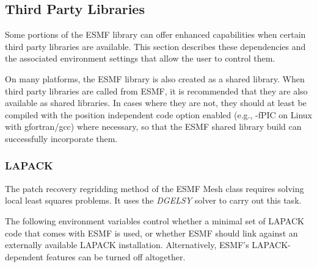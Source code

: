 \subsection{Third Party Libraries}
\label{sec:ThirdParty}

Some portions of the ESMF library can offer enhanced capabilities when
certain third party libraries are available. This section describes
these dependencies and the associated environment settings
that allow the user to control them.

On many platforms, the ESMF library is also created as a shared library.
When third party libraries are called from ESMF, it is recommended that they are
also available as shared libraries.  In cases where they are not, they should at
least be compiled with the position independent code option enabled (e.g., -fPIC on
Linux with gfortran/gcc) where necessary, so that the ESMF shared library
build can successfully incorporate them.

\subsubsection{LAPACK}
\label{sec:lapack}
The patch recovery regridding method of the ESMF Mesh class requires solving
local least squares problems. It uses the
 {\it DGELSY} solver 
to carry out this task.

The following environment variables control whether a minimal set of
LAPACK code that comes with ESMF is used, or whether ESMF should link against
an externally available LAPACK installation. Alternatively, ESMF's
LAPACK-dependent features can be turned off altogether.

